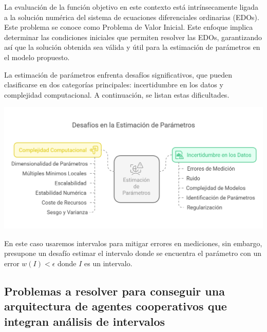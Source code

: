     La evaluación de la función objetivo en este contexto está intrínsecamente ligada a la solución numérica del sistema de ecuaciones diferenciales ordinarias (EDOs). Este problema se conoce como Problema de Valor Inicial. Este enfoque implica determinar las condiciones iniciales que permiten resolver las EDOs, garantizando así que la solución obtenida sea válida y útil para la estimación de parámetros en el modelo propuesto.

        La estimación de parámetros enfrenta desafíos significativos, que pueden clasificarse en dos categorías principales: incertidumbre en los datos y complejidad computacional. A continuación, se listan estas dificultades. \\


        \begin{center}
            \includegraphics[width=1\textwidth]{images/visual-selection.png}
    \end{center}

        En este caso usaremos intervalos para mitigar errores en mediciones, sin embargo, presupone un desafío estimar el intervalo donde se encuentra el parámetro con un error $w(I) < \epsilon$  donde $I$ es un intervalo.\\



        \subsection*{ Problemas a resolver para conseguir una arquitectura de agentes cooperativos que integran análisis de intervalos }

